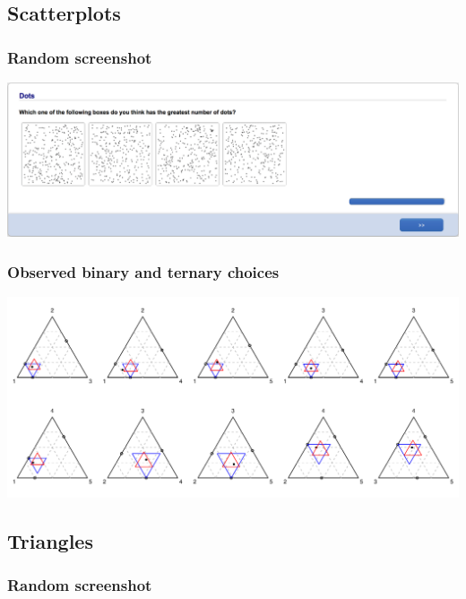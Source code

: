 \documentclass[11pt,letter]{article}
\begin{document}
\pagebreak

\subsection{Scatterplots}



\subsubsection*{Random screenshot}

\includegraphics[width=15cm]{Population_study_design/screenshot_Dots.png}

\subsubsection*{Observed binary and ternary choices}

\includegraphics[width=15cm]{./Population_study_data/Simplexes/Dots.pdf}

\pagebreak

\subsection{Triangles}



\subsubsection*{Random screenshot}
\end{document}
